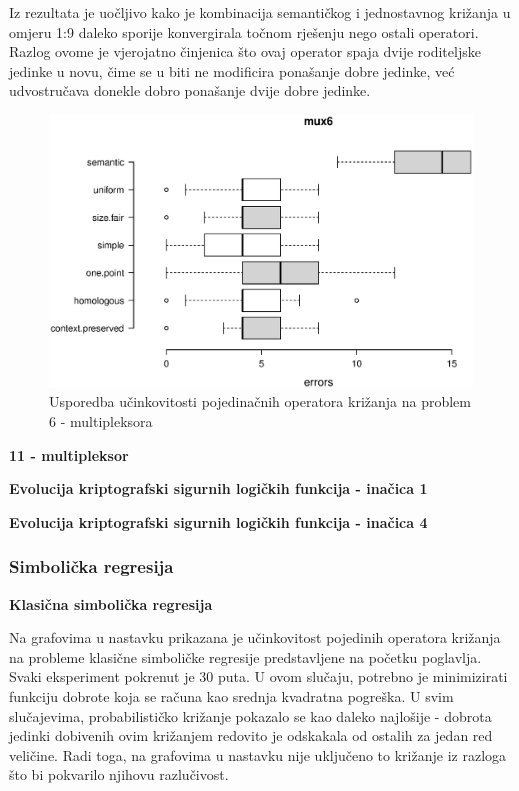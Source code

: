 Iz rezultata je uočljivo kako je kombinacija semantičkog i jednostavnog križanja u omjeru 1:9 daleko sporije konvergirala točnom rješenju nego ostali operatori. Razlog ovome je vjerojatno činjenica što ovaj operator spaja dvije roditeljske jedinke u novu, čime se u biti ne modificira ponašanje dobre jedinke, već udvostručava donekle dobro ponašanje dvije dobre jedinke.

\begin{figure}[H]
	\centering
	\includegraphics[trim=0cm 4cm 0cm 0cm, scale=0.6]{./slike/boxPlots/mux6.eps}
	\caption{Usporedba učinkovitosti pojedinačnih operatora križanja na problem 6 - multipleksora}
	\label{muxbox}
\end{figure}

\textbf{11 - multipleksor}


\textbf{Evolucija kriptografski sigurnih logičkih funkcija - inačica 1}



\textbf{Evolucija kriptografski sigurnih logičkih funkcija - inačica 4}

\subsubsection{Simbolička regresija}

\textbf{Klasična simbolička regresija}


Na grafovima u nastavku prikazana je učinkovitost pojedinih operatora križanja na probleme klasične simboličke regresije predstavljene na početku poglavlja. Svaki eksperiment pokrenut je 30 puta. U ovom slučaju, potrebno je minimizirati funkciju dobrote koja se računa kao srednja kvadratna pogreška. U svim slučajevima, probabilističko križanje pokazalo se kao daleko najlošije - dobrota jedinki dobivenih ovim križanjem redovito je odskakala od ostalih za jedan red veličine. Radi toga, na grafovima u nastavku nije uključeno to križanje iz razloga što bi pokvarilo njihovu razlučivost.

